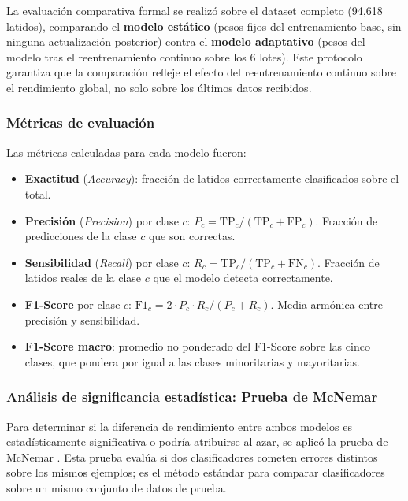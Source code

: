 La evaluación comparativa formal se realizó sobre el dataset completo (94,618 latidos), comparando el \textbf{modelo estático} (pesos fijos del entrenamiento base, sin ninguna actualización posterior) contra el \textbf{modelo adaptativo} (pesos del modelo tras el reentrenamiento continuo sobre los 6 lotes). Este protocolo garantiza que la comparación refleje el efecto del reentrenamiento continuo sobre el rendimiento global, no solo sobre los últimos datos recibidos.

\subsubsection{Métricas de evaluación}

Las métricas calculadas para cada modelo fueron:

\begin{itemize}
\item \textbf{Exactitud} (\textit{Accuracy}): fracción de latidos correctamente clasificados sobre el total.

\item \textbf{Precisión} (\textit{Precision}) por clase $c$: $P_c = \text{TP}_c / (\text{TP}_c + \text{FP}_c)$. Fracción de predicciones de la clase $c$ que son correctas.

\item \textbf{Sensibilidad} (\textit{Recall}) por clase $c$: $R_c = \text{TP}_c / (\text{TP}_c + \text{FN}_c)$. Fracción de latidos reales de la clase $c$ que el modelo detecta correctamente.

\item \textbf{F1-Score} por clase $c$: $\text{F1}_c = 2 \cdot P_c \cdot R_c / (P_c + R_c)$. Media armónica entre precisión y sensibilidad.

\item \textbf{F1-Score macro}: promedio no ponderado del F1-Score sobre las cinco clases, que pondera por igual a las clases minoritarias y mayoritarias.
\end{itemize}

\subsubsection{Análisis de significancia estadística: Prueba de McNemar}

Para determinar si la diferencia de rendimiento entre ambos modelos es estadísticamente significativa o podría atribuirse al azar, se aplicó la prueba de McNemar \cite{McNemar1947}. Esta prueba evalúa si dos clasificadores cometen errores distintos sobre los mismos ejemplos; es el método estándar para comparar clasificadores sobre un mismo conjunto de datos de prueba.

